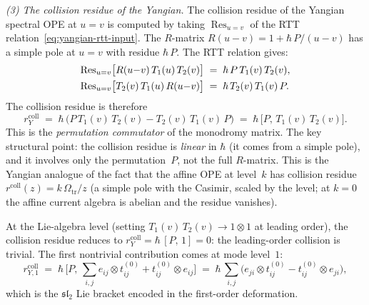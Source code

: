 \begin{computation}
\medskip
\noindent\emph{(3) The collision residue of the Yangian.}
The collision residue of the Yangian spectral OPE
at $u = v$ is computed by taking
$\operatorname{Res}_{u=v}$ of the
RTT relation~\eqref{eq:yangian-rtt-input}. The
$R$-matrix $R(u{-}v) = 1 + \hbar\,P/(u{-}v)$ has
a simple pole at $u = v$ with residue $\hbar\,P$.
The RTT relation gives:
\begin{align}
\operatorname{Res}_{u=v}\bigl[
R(u{-}v)\,T_1(u)\,T_2(v)\bigr]
&\;=\;
\hbar\,P\,T_1(v)\,T_2(v),
\notag\\
\operatorname{Res}_{u=v}\bigl[
T_2(v)\,T_1(u)\,R(u{-}v)\bigr]
&\;=\;
\hbar\,T_2(v)\,T_1(v)\,P.
\notag
\end{align}
The collision residue is therefore
\begin{equation}\label{eq:yangian-collision-residue}
r^{\mathrm{coll}}_Y
\;=\;
\hbar\,\bigl(P\,T_1(v)\,T_2(v)
- T_2(v)\,T_1(v)\,P\bigr)
\;=\;
\hbar\,\bigl[P,\,T_1(v)\,T_2(v)\bigr].
\end{equation}
This is the \emph{permutation commutator} of the
monodromy matrix. The key structural point: the
collision residue is \emph{linear} in $\hbar$ (it comes
from a simple pole), and it involves only the
permutation~$P$, not the full $R$-matrix. This is
the Yangian analogue of the fact that the affine OPE
at level~$k$ has collision residue $r^{\mathrm{coll}}(z) =
k\,\Omega_{\mathrm{tr}}/z$ (a simple pole with the Casimir, scaled by
the level; at $k=0$ the affine current algebra is abelian
and the residue vanishes).

At the Lie-algebra level
(setting $T_1(v)\,T_2(v) \to 1\otimes 1$ at leading
order), the collision residue reduces to
$r^{\mathrm{coll}}_Y = \hbar\,[P,\,1] = 0$:
the leading-order collision is trivial. The first
nontrivial contribution comes at mode level~$1$:
\begin{equation}\label{eq:yangian-collision-mode1}
r^{\mathrm{coll}}_{Y,1}
\;=\;
\hbar\,\bigl[P,\,
\sum_{i,j}e_{ij}\otimes t_{ij}^{(0)}
+ t_{ij}^{(0)}\otimes e_{ij}
\bigr]
\;=\;
\hbar\,\sum_{i,j}
\bigl(e_{ji}\otimes t_{ij}^{(0)}
- t_{ij}^{(0)}\otimes e_{ji}\bigr),
\end{equation}
which is the $\mathfrak{sl}_2$ Lie bracket encoded
in the first-order deformation.


\end{computation}
